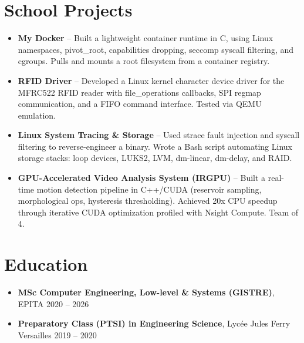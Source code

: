 \documentclass[9pt,a4paper]{article}
\begin{document}
\section*{School Projects}
\begin{tcolorbox}[mybox]
\begin{itemize}
\item \textbf{My Docker} -- Built a lightweight container runtime in C, using Linux namespaces, pivot\_root, capabilities dropping, seccomp syscall filtering, and cgroups. Pulls and mounts a root filesystem from a container registry.

\item \textbf{RFID Driver} -- Developed a Linux kernel character device driver for the MFRC522 RFID reader with file\_operations callbacks, SPI regmap communication, and a FIFO command interface. Tested via QEMU emulation.

\item \textbf{Linux System Tracing \& Storage} -- Used strace fault injection and syscall filtering to reverse-engineer a binary. Wrote a Bash script automating Linux storage stacks: loop devices, LUKS2, LVM, dm-linear, dm-delay, and RAID.

\item \textbf{GPU-Accelerated Video Analysis System (IRGPU)} -- Built a real-time motion detection pipeline in C++/CUDA (reservoir sampling, morphological ops, hysteresis thresholding). Achieved 20x CPU speedup through iterative CUDA optimization profiled with Nsight Compute. Team of 4.
\end{itemize}
\end{tcolorbox}


\section*{Education}
\begin{tcolorbox}[mybox]
\begin{itemize}
\item \textbf{MSc Computer Engineering, Low-level \& Systems (GISTRE)}, EPITA {\small{\hfill 2020 – 2026}}

\item \textbf{Preparatory Class (PTSI) in Engineering Science}, Lycée Jules Ferry Versailles {\small{\hfill 2019 – 2020}}
\end{itemize}
\end{tcolorbox}
\end{document}
